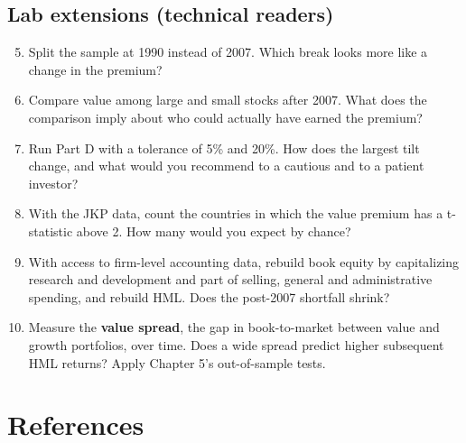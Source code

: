 \subsection*{Lab extensions (technical readers)}

\begin{enumerate}
  \setcounter{enumi}{4}
  \item Split the sample at 1990 instead of 2007. Which break looks more like a change in the premium?
  \item Compare value among large and small stocks after 2007. What does the comparison imply about who could actually have earned the premium?
  \item Run Part D with a tolerance of 5\% and 20\%. How does the largest tilt change, and what would you recommend to a cautious and to a patient investor?
  \item With the JKP data, count the countries in which the value premium has a t-statistic above 2. How many would you expect by chance?
  \item With access to firm-level accounting data, rebuild book equity by capitalizing research and development and part of selling, general and administrative spending, and rebuild HML. Does the post-2007 shortfall shrink?
  \item Measure the \textbf{value spread}, the gap in book-to-market between value and growth portfolios, over time. Does a wide spread predict higher subsequent HML returns? Apply Chapter 5's out-of-sample tests.
\end{enumerate}

\section*{References}

